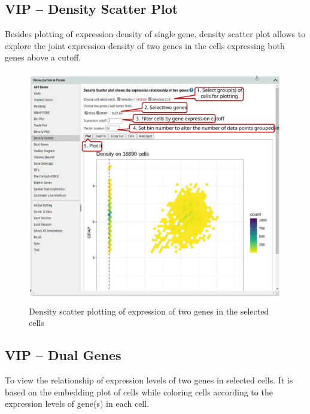 \documentclass[
]{article}
\begin{document}
\hypertarget{vip-density-scatter-plot}{%
\subsection{VIP -- Density Scatter Plot}\label{vip-density-scatter-plot}}

Besides plotting of expression density of single gene, density scatter plot allows to explore the joint expression density of two genes in the cells expressing both genes above a cutoff.

\begin{figure}
\centering
\includegraphics{figures/F27_label.svg}
\caption{Density scatter plotting of expression of two genes in the selected cells}
\end{figure}

\hypertarget{vip-dual-genes}{%
\subsection{VIP -- Dual Genes}\label{vip-dual-genes}}

To view the relationship of expression levels of two genes in selected cells. It is based on the embedding plot of cells while coloring cells according to the expression levels of gene(s) in each cell.
\end{document}

